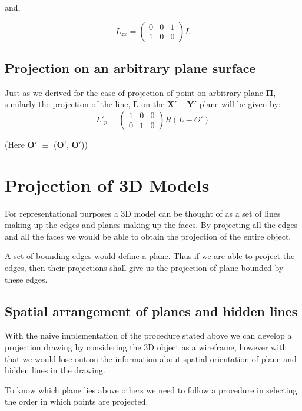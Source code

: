 \documentclass[a4paper,11pt,openany]{book}
\begin{document}
and,

\begin{equation}
L_{zx} = 
\left(\begin{array}{ccc} 0 & 0 & 1 \\ 1 & 0 & 0 \end{array}\right)L
\end{equation}

\subsection{Projection on an arbitrary plane surface}
Just as we derived for the case of projection of point on arbitrary plane $\boldsymbol{\Pi}$, similarly the projection of the line, $\boldsymbol{L}$ on the $\boldsymbol{X'-Y'}$ plane will be given by:
\begin{equation}
L'_p = 
\left(\begin{array}{ccc} 1 & 0 & 0 \\ 0 & 1 & 0 \end{array}\right)R(L-O')
\end{equation}

\indent (Here $\boldsymbol{O'}$ $\equiv$ ($\boldsymbol{O'}$, $\boldsymbol{O'}$))

\section{Projection of 3D Models}
For representational purposes a 3D model can be thought of as a set of lines making up the edges and planes making up the faces. By projecting all the edges and all the faces we would be able to obtain the projection of the entire object.

A set of bounding edges would define a plane. Thus if we are able to project the edges, then their projections shall give us the projection of plane bounded by these edges. 

\subsection{Spatial arrangement of planes and hidden lines}
With the naive implementation of the procedure stated above we can develop a projection drawing by considering the 3D object as a wireframe, however with that we would lose out on the information about spatial orientation of plane and hidden lines in the drawing.

To know which plane lies above others we need to follow a procedure in selecting the order in which points are projected.
\end{document}
